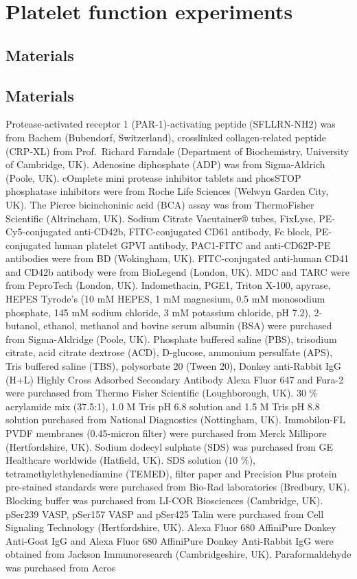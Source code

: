 \documentclass[11pt,twoside]{bristolthesis}
\begin{document}
\hypertarget{platelet-function-experiments}{%
\section{Platelet function experiments}\label{platelet-function-experiments}}

\hypertarget{materials}{%
\subsection{Materials}\label{materials}}

\hypertarget{materials-1}{%
\subsection{Materials}\label{materials-1}}

Protease-activated receptor 1 (PAR-1)-activating peptide (SFLLRN-NH2) was from Bachem (Bubendorf, Switzerland), crosslinked collagen-related peptide (CRP-XL) from Prof.~Richard Farndale (Department of Biochemistry, University of Cambridge, UK). Adenosine diphosphate (ADP) was from Sigma-Aldrich (Poole, UK). cOmplete mini protease inhibitor tablets and phosSTOP phosphatase inhibitors were from Roche Life Sciences (Welwyn Garden City, UK). The Pierce bicinchoninic acid (BCA) assay was from ThermoFisher Scientific (Altrincham, UK). Sodium Citrate Vacutainer® tubes, FixLyse, PE-Cy5-conjugated anti-CD42b, FITC-conjugated CD61 antibody, Fc block, PE-conjugated human platelet GPVI antibody, PAC1-FITC and anti-CD62P-PE antibodies were from BD (Wokingham, UK). FITC-conjugated anti-human CD41 and CD42b antibody were from BioLegend (London, UK). MDC and TARC were from PeproTech (London, UK). Indomethacin, PGE1, Triton X-100, apyrase, HEPES Tyrode's (10 mM HEPES, 1 mM magnesium, 0.5 mM monosodium phosphate, 145 mM sodium chloride, 3 mM potassium chloride, pH 7.2), 2-butanol, ethanol, methanol and bovine serum albumin (BSA) were purchased from Sigma-Aldridge (Poole, UK). Phosphate buffered saline (PBS), trisodium citrate, acid citrate dextrose (ACD), D-glucose, ammonium persulfate (APS), Tris buffered saline (TBS), polysorbate 20 (Tween 20), Donkey anti-Rabbit IgG (H+L) Highly Cross Adsorbed Secondary Antibody Alexa Fluor 647 and Fura-2 were purchased from Thermo Fisher Scientific (Loughborough, UK). 30 \% acrylamide mix (37.5:1), 1.0 M Tris pH 6.8 solution and 1.5 M Tris pH 8.8 solution purchased from National Diagnostics (Nottingham, UK). Immobilon-FL PVDF membranes (0.45-micron filter) were purchased from Merck Millipore (Hertfordshire, UK). Sodium dodecyl sulphate (SDS) was purchased from GE Healthcare worldwide (Hatfield, UK). SDS solution (10 \%), tetramethylethylenediamine (TEMED), filter paper and Precision Plus protein pre-stained standards were purchased from Bio-Rad laboratories (Bredbury, UK). Blocking buffer was purchased from LI-COR Biosciences (Cambridge, UK). pSer239 VASP, pSer157 VASP and pSer425 Talin were purchased from Cell Signaling Technology (Hertfordshire, UK). Alexa Fluor 680 AffiniPure Donkey Anti-Goat IgG and Alexa Fluor 680 AffiniPure Donkey Anti-Rabbit IgG were obtained from Jackson Immunoresearch (Cambridgeshire, UK). Paraformaldehyde was purchased from Acros 
\end{document}
